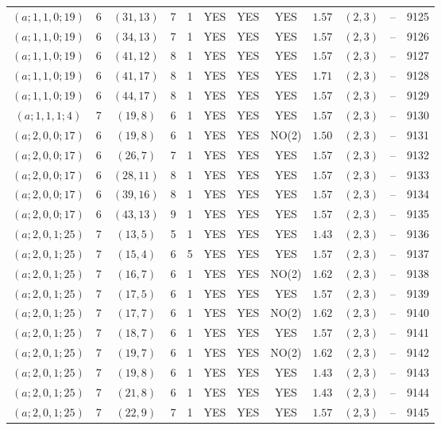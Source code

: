 \begin{longtable}{|c|c|c|c|c|c|c|c|c|c|c|c|}
$(a;1,1,0;19)$ & 6 & $(31,13)$ & 7 & 1 & YES & YES & YES & $1.57$ & $(2,3)$ & -- & 9125\\
$(a;1,1,0;19)$ & 6 & $(34,13)$ & 7 & 1 & YES & YES & YES & $1.57$ & $(2,3)$ & -- & 9126\\
$(a;1,1,0;19)$ & 6 & $(41,12)$ & 8 & 1 & YES & YES & YES & $1.57$ & $(2,3)$ & -- & 9127\\
$(a;1,1,0;19)$ & 6 & $(41,17)$ & 8 & 1 & YES & YES & YES & $1.71$ & $(2,3)$ & -- & 9128\\
$(a;1,1,0;19)$ & 6 & $(44,17)$ & 8 & 1 & YES & YES & YES & $1.57$ & $(2,3)$ & -- & 9129\\
$(a;1,1,1;4)$ & 7 & $(19,8)$ & 6 & 1 & YES & YES & YES & $1.57$ & $(2,3)$ & -- & 9130\\
$(a;2,0,0;17)$ & 6 & $(19,8)$ & 6 & 1 & YES & YES & NO(2) & $1.50$ & $(2,3)$ & -- & 9131\\
$(a;2,0,0;17)$ & 6 & $(26,7)$ & 7 & 1 & YES & YES & YES & $1.57$ & $(2,3)$ & -- & 9132\\
$(a;2,0,0;17)$ & 6 & $(28,11)$ & 8 & 1 & YES & YES & YES & $1.57$ & $(2,3)$ & -- & 9133\\
$(a;2,0,0;17)$ & 6 & $(39,16)$ & 8 & 1 & YES & YES & YES & $1.57$ & $(2,3)$ & -- & 9134\\
$(a;2,0,0;17)$ & 6 & $(43,13)$ & 9 & 1 & YES & YES & YES & $1.57$ & $(2,3)$ & -- & 9135\\
$(a;2,0,1;25)$ & 7 & $(13,5)$ & 5 & 1 & YES & YES & YES & $1.43$ & $(2,3)$ & -- & 9136\\
$(a;2,0,1;25)$ & 7 & $(15,4)$ & 6 & 5 & YES & YES & YES & $1.57$ & $(2,3)$ & -- & 9137\\
$(a;2,0,1;25)$ & 7 & $(16,7)$ & 6 & 1 & YES & YES & NO(2) & $1.62$ & $(2,3)$ & -- & 9138\\
$(a;2,0,1;25)$ & 7 & $(17,5)$ & 6 & 1 & YES & YES & YES & $1.57$ & $(2,3)$ & -- & 9139\\
$(a;2,0,1;25)$ & 7 & $(17,7)$ & 6 & 1 & YES & YES & NO(2) & $1.62$ & $(2,3)$ & -- & 9140\\
$(a;2,0,1;25)$ & 7 & $(18,7)$ & 6 & 1 & YES & YES & YES & $1.57$ & $(2,3)$ & -- & 9141\\
$(a;2,0,1;25)$ & 7 & $(19,7)$ & 6 & 1 & YES & YES & NO(2) & $1.62$ & $(2,3)$ & -- & 9142\\
$(a;2,0,1;25)$ & 7 & $(19,8)$ & 6 & 1 & YES & YES & YES & $1.43$ & $(2,3)$ & -- & 9143\\
$(a;2,0,1;25)$ & 7 & $(21,8)$ & 6 & 1 & YES & YES & YES & $1.43$ & $(2,3)$ & -- & 9144\\
$(a;2,0,1;25)$ & 7 & $(22,9)$ & 7 & 1 & YES & YES & YES & $1.57$ & $(2,3)$ & -- & 9145\\

\end{longtable}
